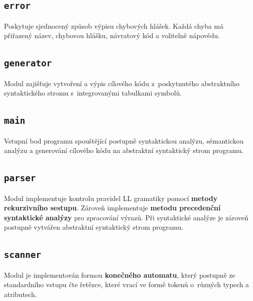 \documentclass[a4paper, 11pt]{article}
\begin{document}
    \vspace{-1em}
    \subsection{\texttt{error}}
    \label{module:error}
    \vspace{-0.5em}
        Poskytuje sjednocený způsob výpisu chybových hlášek. Každá chyba má přiřazený název,
        chybovou hlášku, návratový kód a volitelně nápovědu.

    \vspace{-1em}
    \subsection{\texttt{generator}}
    \label{module:generator}
    \vspace{-0.5em}
        Modul zajišťuje vytvoření a výpis cílového kódu z~poskytnutého abstraktního syntaktického stromu
        s~integrovanými tabulkami symbolů.

    \vspace{-1em}
    \subsection{\texttt{main}}
    \label{module:main}
    \vspace{-0.5em}
        Vstupní bod programu spouštějící postupně syntaktickou analýzu, sémantickou
        analýzu a generování cílového kódu na abstraktní syntaktický strom programu.

    \vspace{-1em}
    \subsection{\texttt{parser}}
    \label{module:parser}
    \vspace{-0.5em}
        Modul implementuje kontrolu pravidel LL gramatiky pomocí \textbf{metody rekurzivního sestupu}. Zároveň
        implementuje \textbf{metodu precedenční syntaktické analýzy} pro zpracování výrazů. Při syntaktické
        analýze je zároveň postupně vytvářen abstraktní syntaktický strom programu.

    \vspace{-1em}
    \subsection{\texttt{scanner}}
    \label{module:scanner}
    \vspace{-0.5em}
        Modul je implementován formou \textbf{konečného automatu}, který postupně ze standardního vstupu
        čte řetězce, které vrací ve formě tokenů o~různých typech a atributech.
\end{document}
